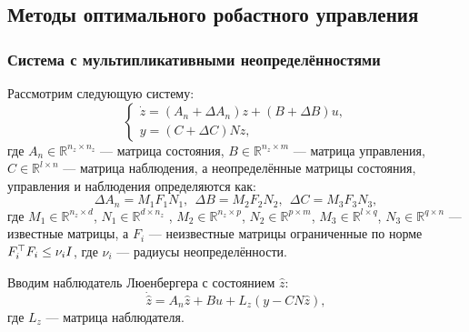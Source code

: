 \subsection{Методы оптимального робастного управления}

\begin{frame}
    \frametitle{Система с мультипликативными неопределённостями}
    Рассмотрим следующую систему:
    \begin{equation}
    	\label{eq:part2_linear_dynamics}
    	\begin{cases}
    		\dot z=({A}_n+\Delta {A}_n)z + ({B}+\Delta {B})u,\\
    		y = ({C}+ \Delta {C}){N}  z,
    	\end{cases}
    \end{equation}
    где $A_n \in \mathbb{R}^{n_z \times n_z}$ --- матрица состояния, $B \in \mathbb{R}^{n_z \times m}$ --- матрица управления, $C \in \mathbb{R}^{l \times n}$ --- матрица наблюдения, а неопределённые матрицы состояния, управления и наблюдения определяются как:
    \begin{equation}
    	\label{eq:part2_uncertainty}
    	\Delta {A}_n={M}_1{F}_1{N}_1, \ \ \Delta {B}= {M}_2{F}_2{N}_2, \ \
    	\Delta {C} = {M}_3{F}_3{N}_3,
    \end{equation}
    где ${M}_1 \in \mathbb{R}^{n_z \times d}$, 
    ${N}_1 \in \mathbb{R}^{d \times n_z}$ , ${M}_2 \in \mathbb{R}^{n_z \times p}$,
    ${N}_2 \in \mathbb{R}^{p \times m}$, ${M}_3 \in \mathbb{R}^{l \times q}$,
    ${N}_3 \in \mathbb{R}^{q \times n}$ --- известные матрицы, 
    а ${F}_i$ --- неизвестные матрицы ограниченные по норме ${F}_i^\top{F}_i\leq \nu_i {I}$, где $\nu_i$ --- радиусы неопределённости.
    
    Вводим наблюдатель Люенбергера с состоянием $\hat{z}$:
    \begin{equation}
    	\label{eq:Luenberger}
    	\dot{\hat{z}}={A}_n\hat{z}+{B}u+{L}_z(y- {C} {N}\hat{z}),
    \end{equation}
    где ${L}_z$ --- матрица наблюдателя. 
 
\end{frame}

